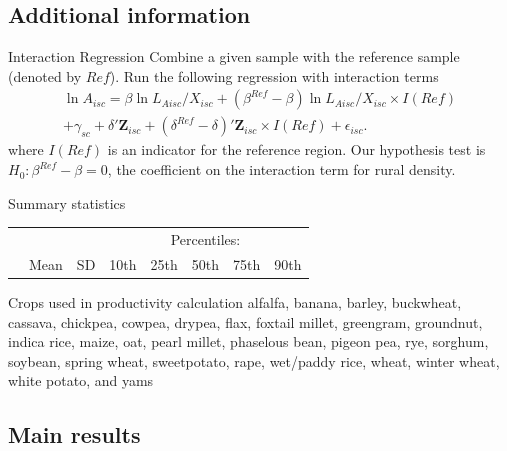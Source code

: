 \documentclass[10pt, xcolor=dvipsnames]{beamer}
\begin{document}
\subsection{Additional information}
\begin{frame}{Interaction Regression}\label{interaction}
Combine a given sample with the reference sample (denoted by $Ref$). Run the following regression with interaction terms
\begin{eqnarray}
    \ln A_{isc} = \beta \ln L_{Aisc}/X_{isc} + (\beta^{Ref} - \beta) \ln L_{Aisc}/X_{isc} \times I(Ref) \\ \nonumber
    + \gamma_{sc} + \delta' \mathbf{Z}_{isc} + (\delta^{Ref} - \delta)'\mathbf{Z}_{isc} \times I(Ref) + \epsilon_{isc}. \label{EQ_interaction}
\end{eqnarray}
where $I(Ref)$ is an indicator for the reference region. Our hypothesis test is $H_0: \beta^{Ref} - \beta = 0$, the coefficient on the interaction term for rural density. 

\hfill \hyperlink{testing}{}
\end{frame}

\begin{frame}{Summary statistics}\label{stats}
{\scriptsize
\begin{tabularx}{\textwidth}{lXXXXXXX}
\midrule
 &      &            & \multicolumn{5}{c}{Percentiles:} \\ \cmidrule{4-8}
 & Mean & SD  & 10th    & 25th    & 50th & 75th & 90th \\
\midrule

\midrule
\end{tabularx}
}

\hfill \hyperlink{data}{}
\end{frame}

\begin{frame}{Crops used in productivity calculation}\label{crops}
alfalfa, banana, barley, buckwheat, cassava, chickpea, cowpea, drypea, flax, foxtail millet, greengram, groundnut, indica rice, maize, oat, pearl millet, phaselous bean, pigeon pea, rye, sorghum, soybean, spring wheat, sweetpotato, rape, wet/paddy rice, wheat, winter wheat, white potato, and yams

\hfill \hyperlink{data}{}
\end{frame}

\subsection{Main results}
\end{document}
